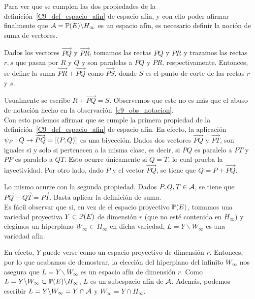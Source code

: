 Para ver que se cumplen las dos propiedades de la definición~\ref{C9_def_espacio_afin} de espacio afín, y con ello poder afirmar finalmente que $\mathcal{A}=\mathbb{P}(E)\backslash H_\infty$ es un espacio afín, es necesario definir la noción de suma de vectores.
\begin{defi}
	Dados los vectores $\overrightarrow{PQ}$ y $\overrightarrow{PR}$, tomamos las rectas $PQ$ y $PR$ y trazamos las rectas $r,s$ que pasan por $R$ y $Q$ y son paralelas a $PQ$ y $PR$, respectivamente. Entonces, se define la suma $\overrightarrow{PR}+\overrightarrow{PQ}$ como $\overrightarrow{PS}$, donde $S$ es el punto de corte de las rectas $r$ y $s$.
\end{defi}
Usualmente se escribe $R+\overrightarrow{PQ}=S$. Observemos que este no es más que el abuso de notación hecho en la observación~\ref{c9_obs_notacion}.\\

Con esto podemos afirmar que se cumple la primera propiedad de la definición~\ref{C9_def_espacio_afin} de espacio afín. En efecto, la aplicación $\psi_P:Q\rightarrow \overrightarrow{PQ}=\left [ (P,Q) \right ]$ es una biyección. Dados dos vectores $\overrightarrow{PQ}$ y $\overrightarrow{PT}$, son iguales si y solo si pertenecen a la misma clase, es decir, si $PQ$ es paralelo a $PT$ y $PP$ es paralelo a $QT$. Esto ocurre únicamente si $Q=T$, lo cual prueba la inyectividad. Por otro lado, dado $P$ y el vector $\overrightarrow{PQ}$, se tiene que $Q=P+\overrightarrow{PQ}$.

Lo mismo ocurre con la segunda propiedad. Dados $P,Q,T\in\mathcal{A}$, se tiene que $\overrightarrow{PQ}+\overrightarrow{QT}=\overrightarrow{PT}$. Basta aplicar la definición de suma.\\

Es fácil observar que si, en vez de el espacio proyectivo $\mathbb{P}(E)$, tomamos una variedad proyectiva $Y\subset\mathbb{P}(E)$ de dimensión $r$ (que no esté contenida en $H_\infty$) y elegimos un hiperplano $W_\infty\subset H_\infty$ en dicha variedad, $L=Y\backslash W_\infty$ es una variedad afín.

En efecto, $Y$ puede verse como un espacio proyectivo de dimensión $r$. Entonces, por lo que acabamos de demostrar, la elección del hiperplano del infinito $W_\infty$ nos asegura que $L=Y\backslash W_\infty$ es un espacio afín de dimensión $r$. Como $L=Y\backslash W_\infty\subset\mathbb{P}(E)\backslash H_\infty$, $L$ es un subespacio afín de $\mathcal{A}$. Además, podemos escribir $L=Y\backslash W_\infty=Y\cap\mathcal{A}$ y $W_\infty=Y\cap H_\infty$.

